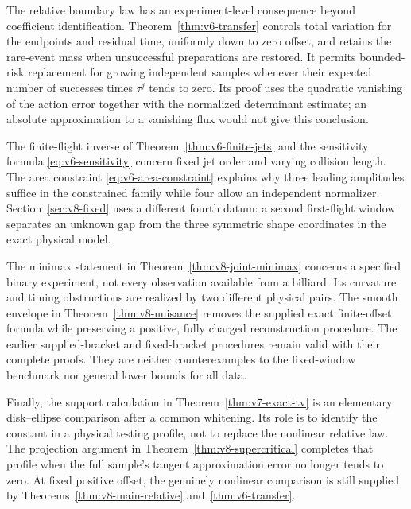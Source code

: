 The relative boundary law has an experiment-level consequence beyond
coefficient identification. Theorem~\ref{thm:v6-transfer} controls total
variation for the endpoints and residual time, uniformly down to zero
offset, and retains the rare-event mass when unsuccessful preparations
are restored. It permits bounded-risk replacement for growing independent
samples whenever their expected number of successes times $\tau^j$
tends to zero. Its proof uses the quadratic vanishing of the action
error together with the normalized determinant estimate; an absolute
approximation to a vanishing flux would not give this conclusion.

The finite-flight inverse of Theorem~\ref{thm:v6-finite-jets} and the
sensitivity formula \eqref{eq:v6-sensitivity} concern fixed jet order
and varying collision length. The area constraint
\eqref{eq:v6-area-constraint} explains why three leading amplitudes
suffice in the constrained family while four allow an independent
normalizer. Section~\ref{sec:v8-fixed} uses a different fourth datum:
a second first-flight window separates an unknown gap from the three
symmetric shape coordinates in the exact physical model.

The minimax statement in Theorem~\ref{thm:v8-joint-minimax} concerns a
specified binary experiment, not every observation available from a
billiard. Its curvature and timing obstructions are realized by two
different physical pairs. The smooth envelope in
Theorem~\ref{thm:v8-nuisance} removes the supplied exact finite-offset
formula while preserving a positive, fully charged reconstruction
procedure. The earlier supplied-bracket and fixed-bracket procedures
remain valid with their complete proofs. They are neither counterexamples
to the fixed-window benchmark nor general lower bounds for all data.

Finally, the support calculation in Theorem~\ref{thm:v7-exact-tv} is
an elementary disk--ellipse comparison after a common whitening.
Its role is to identify the constant in a physical testing profile,
not to replace the nonlinear relative law. The projection argument in
Theorem~\ref{thm:v8-supercritical} completes that profile when the full
sample's tangent approximation error no longer tends to zero. At fixed
positive offset, the genuinely nonlinear comparison is still supplied
by Theorems~\ref{thm:v8-main-relative} and~\ref{thm:v6-transfer}.
